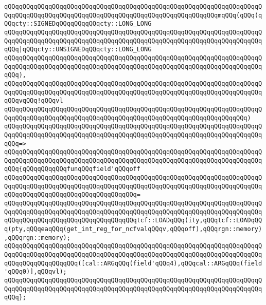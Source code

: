 \newline
\verb|qQQqqQQqqQQqqQQqqQQqqQQqqQQqqQQqqQQqqQQqqQQqqQQqqQQqqQQqqQQqqQQqqQQqqQQqqQQqqQQqqQQqqQQqqQQqqQQqqQQqqQQqqQQqqQQqqQQqqQQqqQQqqQQqmqQQq(qQQq(qQQqcty::SIGNEDqQQqqQQqqQQqcty::LONG_LONG|\newline
\verb|qQQqqQQqqQQqqQQqqQQqqQQqqQQqqQQqqQQqqQQqqQQqqQQqqQQqqQQqqQQqqQQqqQQqqQQqqQQqqQQqqQQqqQQqqQQqqQQqqQQqqQQqqQQqqQQqqQQqqQQqqQQqqQQqqQQqqQQqqQQqqQQq|\verb#|qQQqcty::UNSIGNEDqQQqcty::LONG_LONG#\newline
\verb|qQQqqQQqqQQqqQQqqQQqqQQqqQQqqQQqqQQqqQQqqQQqqQQqqQQqqQQqqQQqqQQqqQQqqQQqqQQqqQQqqQQqqQQqqQQqqQQqqQQqqQQqqQQqqQQqqQQqqQQqqQQqqQQqqQQqqQQqqQQqqQQq),|\newline
\verb|qQQqqQQqqQQqqQQqqQQqqQQqqQQqqQQqqQQqqQQqqQQqqQQqqQQqqQQqqQQqqQQqqQQqqQQqqQQqqQQqqQQqqQQqqQQqqQQqqQQqqQQqqQQqqQQqqQQqqQQqqQQqqQQqqQQqqQQqqQQqqQQqvqQQq!qQQqvl|\newline
\verb|qQQqqQQqqQQqqQQqqQQqqQQqqQQqqQQqqQQqqQQqqQQqqQQqqQQqqQQqqQQqqQQqqQQqqQQqqQQqqQQqqQQqqQQqqQQqqQQqqQQqqQQqqQQqqQQqqQQqqQQqqQQqqQQqqQQqqQQq)|\newline
\verb|qQQqqQQqqQQqqQQqqQQqqQQqqQQqqQQqqQQqqQQqqQQqqQQqqQQqqQQqqQQqqQQqqQQqqQQqqQQqqQQqqQQqqQQqqQQqqQQqqQQqqQQqqQQqqQQqqQQqqQQqqQQqqQQqqQQqqQQqqQQqqQQq=>|\newline
\verb|qQQqqQQqqQQqqQQqqQQqqQQqqQQqqQQqqQQqqQQqqQQqqQQqqQQqqQQqqQQqqQQqqQQqqQQqqQQqqQQqqQQqqQQqqQQqqQQqqQQqqQQqqQQqqQQqqQQqqQQqqQQqqQQqqQQqqQQqqQQqqQQq{qQQqqQQqqQQqfunqQQqfield'qQQqoff|\newline
\verb|qQQqqQQqqQQqqQQqqQQqqQQqqQQqqQQqqQQqqQQqqQQqqQQqqQQqqQQqqQQqqQQqqQQqqQQqqQQqqQQqqQQqqQQqqQQqqQQqqQQqqQQqqQQqqQQqqQQqqQQqqQQqqQQqqQQqqQQqqQQqqQQqqQQqqQQqqQQqqQQqqQQqqQQqqQQqqQQq=|\newline
\verb|qQQqqQQqqQQqqQQqqQQqqQQqqQQqqQQqqQQqqQQqqQQqqQQqqQQqqQQqqQQqqQQqqQQqqQQqqQQqqQQqqQQqqQQqqQQqqQQqqQQqqQQqqQQqqQQqqQQqqQQqqQQqqQQqqQQqqQQqqQQqqQQqqQQqqQQqqQQqqQQqqQQqqQQqqQQqqQQqtcf::LOADqQQq(ity,qQQqtcf::LOADqQQq(pty,qQQqeaqQQq(get_int_reg_for_ncfvalqQQqv,qQQqoff),qQQqrgn::memory),qQQqrgn::memory);|\newline
\newline
\verb|qQQqqQQqqQQqqQQqqQQqqQQqqQQqqQQqqQQqqQQqqQQqqQQqqQQqqQQqqQQqqQQqqQQqqQQqqQQqqQQqqQQqqQQqqQQqqQQqqQQqqQQqqQQqqQQqqQQqqQQqqQQqqQQqqQQqqQQqqQQqqQQqqQQqqQQqqQQqqQQq([cal::ARGqQQq(field'qQQq4),qQQqcal::ARGqQQq(field'qQQq0)],qQQqvl);|\newline
\verb|qQQqqQQqqQQqqQQqqQQqqQQqqQQqqQQqqQQqqQQqqQQqqQQqqQQqqQQqqQQqqQQqqQQqqQQqqQQqqQQqqQQqqQQqqQQqqQQqqQQqqQQqqQQqqQQqqQQqqQQqqQQqqQQqqQQqqQQqqQQqqQQq};|\newline
